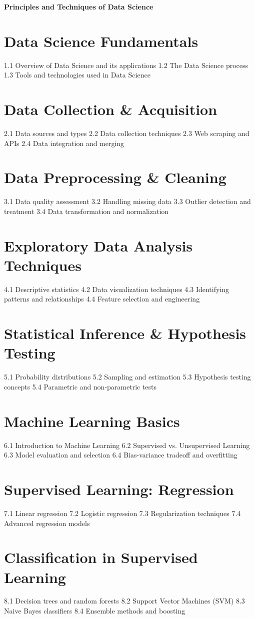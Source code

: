 {\LARGE \bf{Principles and Techniques of Data Science}}
\section{Data Science Fundamentals}
1.1 Overview of Data Science and its applications
1.2 The Data Science process
1.3 Tools and technologies used in Data Science
\section{Data Collection \& Acquisition}
2.1 Data sources and types
2.2 Data collection techniques
2.3 Web scraping and APIs
2.4 Data integration and merging
\section{Data Preprocessing \& Cleaning}
3.1 Data quality assessment
3.2 Handling missing data
3.3 Outlier detection and treatment
3.4 Data transformation and normalization
\section{Exploratory Data Analysis Techniques}
4.1 Descriptive statistics
4.2 Data visualization techniques
4.3 Identifying patterns and relationships
4.4 Feature selection and engineering
\section{Statistical Inference \& Hypothesis Testing}
5.1 Probability distributions
5.2 Sampling and estimation
5.3 Hypothesis testing concepts
5.4 Parametric and non-parametric tests
\section{Machine Learning Basics}
6.1 Introduction to Machine Learning
6.2 Supervised vs. Unsupervised Learning
6.3 Model evaluation and selection
6.4 Bias-variance tradeoff and overfitting
\section{Supervised Learning: Regression}
7.1 Linear regression
7.2 Logistic regression
7.3 Regularization techniques
7.4 Advanced regression models
\section{Classification in Supervised Learning}
8.1 Decision trees and random forests
8.2 Support Vector Machines (SVM)
8.3 Naive Bayes classifiers
8.4 Ensemble methods and boosting
